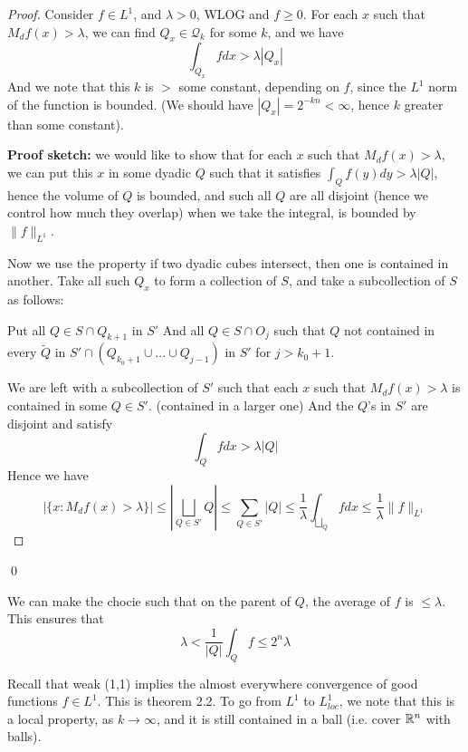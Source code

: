 \begin{proof}
    Consider $f\in L^1$, and $\lambda>0$, WLOG and $f\geq 0$. For each $x$ such that $M_df(x)>\lambda$, we can find $Q_x\in \mathcal{Q}_k$ for some $k$, and we have
    \begin{equation*}
        \int_{Q_x}fdx>\lambda|Q_x|
    \end{equation*}
    And we note that this $k$ is $>$ some constant, depending on $f$, since the $L^1$ norm of the function is bounded. (We should have $|Q_x|=2^{-kn}<\infty$, hence $k$ greater than some constant).

    \textbf{Proof sketch:} we would like to show that for each $x$ such that $M_df(x)>\lambda$, we can put this $x$ in some dyadic $Q$ such that it satisfies $\int_Qf(y)dy>\lambda|Q|$, hence the volume of $Q$ is bounded, and such all $Q$ are all disjoint (hence we control how much they overlap) when we take the integral, is bounded by $\|f\|_{L^1}$.

    Now we use the property if two dyadic cubes intersect, then one is contained in another. Take all such $Q_x$ to form a collection of $S$, and take a subcollection of $S$ as follows:

    Put all $Q\in S\cap Q_{k+1}$ in $S'$ And all $Q\in S\cap O_j$ such that $Q$ not contained in every $\tilde{Q}$ in $S'\cap(Q_{k_0+1}\cup...\cup Q_{j-1})$ in $S'$ for $j>k_0+1$.

    We are left with a subcollection of $S'$ such that each $x$ such that $M_df(x)>\lambda$ is contained in some $Q\in S'$. (contained in a larger one) And the $Q$'s in $S'$ are disjoint and satisfy 
    \begin{equation*}
        \int_Qfdx>\lambda|Q|
    \end{equation*}
    Hence we have
    \begin{equation*}
        |\{x: M_df(x)>\lambda\}|\leq|\bigsqcup_{Q\in S'}Q |\leq\sum_{Q\in S'}|Q|\leq \frac{1}{\lambda}\int_{\bigsqcup_Q}fdx\leq\frac{1}{\lambda}\|f\|_{L^1}
    \end{equation*}
\end{proof}
\qed


\begin{remark}
    We can make the chocie such that on the parent of $Q$, the average of $f$ is $\leq\lambda$. This ensures that 
    \begin{equation*}
        \lambda<\frac{1}{|Q|}\int_Qf\leq 2^n\lambda
    \end{equation*}

    Recall that weak (1,1) implies the almost everywhere convergence of good functions $f\in L^1$. This is theorem 2.2. To go from $L^1$ to $L_{loc}^1$, we note that this is a local property, as $k\to\infty$, and it is still contained in a ball (i.e. cover $\mathbb{R}^n$ with balls).
\end{remark}

